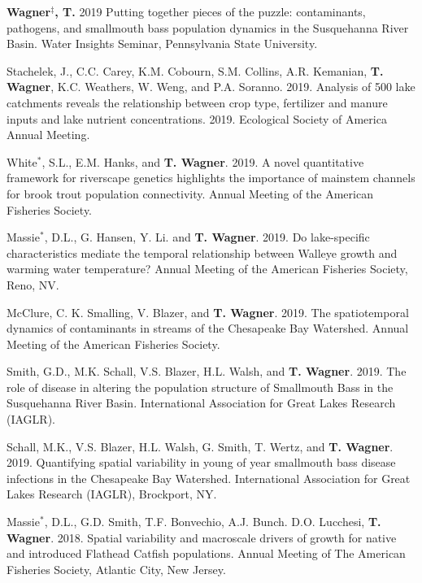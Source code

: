 \documentclass[10pt]{article}
\begin{document}
\begin{flushleft}
\begin{etaremune}
\item \textbf{Wagner$^\ddagger$, T.} 2019 Putting together pieces of the puzzle: contaminants, pathogens, and smallmouth bass population dynamics in the Susquehanna River Basin. Water Insights Seminar, Pennsylvania State University. 

\item Stachelek, J., C.C. Carey, K.M. Cobourn, S.M. Collins, A.R. Kemanian, \textbf{T. Wagner}, K.C. Weathers, W. Weng, and P.A. Soranno. 2019. Analysis of 500 lake catchments reveals the relationship between crop type, fertilizer and manure inputs and lake nutrient concentrations. 2019. Ecological Society of America Annual Meeting.

\item White$^*$, S.L., E.M. Hanks, and \textbf{T. Wagner}. 2019. A novel quantitative framework for riverscape genetics highlights the importance of mainstem channels for brook trout population connectivity. Annual Meeting of the American Fisheries Society.

\item Massie$^*$, D.L., G. Hansen, Y. Li. and \textbf{T. Wagner}. 2019. Do lake-specific characteristics mediate the temporal relationship between Walleye growth and warming water temperature? Annual Meeting of the American Fisheries Society, Reno, NV.

\item McClure, C. K. Smalling, V. Blazer, and \textbf{T. Wagner}. 2019. The spatiotemporal dynamics of contaminants in streams of the Chesapeake Bay Watershed. Annual Meeting of the American Fisheries Society.

\item Smith, G.D., M.K. Schall, V.S. Blazer, H.L. Walsh, and \textbf{T. Wagner}. 2019. The role of disease in altering the population structure of Smallmouth Bass in the Susquehanna River Basin. International Association for Great Lakes Research (IAGLR). 

\item Schall, M.K., V.S. Blazer, H.L. Walsh, G. Smith, T. Wertz, and \textbf{T. Wagner}. 2019. Quantifying spatial variability in young of year smallmouth bass disease infections in the Chesapeake Bay Watershed. International Association for Great Lakes Research (IAGLR), Brockport, NY.

\item Massie$^*$, D.L., G.D. Smith, T.F. Bonvechio, A.J. Bunch. D.O. Lucchesi, {\bf T. Wagner}. 2018. Spatial variability and macroscale drivers of growth for native and introduced Flathead Catfish populations. Annual Meeting of The American Fisheries Society, Atlantic City, New Jersey.


\end{etaremune}
\end{flushleft}
\end{document}
